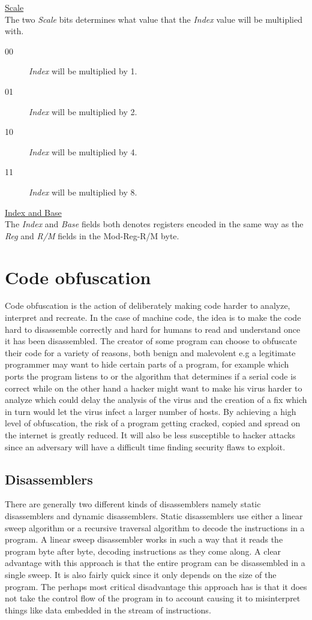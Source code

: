 \documentclass[11pt,twoside]{eitExjobb}
\begin{document}
\noindent \uline{Scale}\\
The two \emph{Scale} bits determines what value that the \emph{Index} value will be multiplied with.\\
\begin{description}
\item[00] \emph{Index} will be multiplied by 1.  
\item[01] \emph{Index} will be multiplied by 2.
\item[10] \emph{Index} will be multiplied by 4.
\item[11] \emph{Index} will be multiplied by 8.
\end{description}

\noindent \uline{Index and Base}\\
The \emph{Index} and \emph{Base} fields both denotes registers encoded in the same way as the \emph{Reg} and \emph{R/M} fields in the Mod-Reg-R/M byte. \cite{bittwiddling}\cite{assemblylanguagex86}

\section{Code obfuscation}
Code obfuscation is the action of deliberately making code harder to analyze, interpret and recreate. In the case of machine code, the idea is to make the code hard to disassemble correctly and hard for humans to read and understand once it has been disassembled. The creator of some program can choose to obfuscate their code for a variety of reasons, both benign and malevolent e.g a legitimate programmer may want to hide certain parts of a program, for example which ports the program listens to or the algorithm that determines if a serial code is correct while on the other hand  a hacker might  want to make his virus harder to analyze which could delay the analysis of the virus and the creation of a fix which in turn would let the virus infect a larger number of hosts. By achieving a high level of obfuscation, the risk of a program getting cracked, copied and spread on the internet is greatly reduced. It will also be less susceptible to hacker attacks since an adversary will have a difficult time finding security flaws to exploit.

\subsection{Disassemblers}
There are generally two different kinds of disassemblers namely static disassemblers and dynamic disassemblers. Static disassemblers use either a linear sweep algorithm or a recursive traversal algorithm to decode the instructions in a program. A linear sweep disassembler works in such a way that it reads the program byte after byte, decoding instructions as they come along. A clear advantage with this approach is that the entire program can be disassembled in a single sweep. It is also fairly quick since it only depends on the size of the program. The perhaps most critical disadvantage this approach has is that it does not take the control flow of the program in to account causing it to misinterpret things like data embedded in the stream of instructions.
\end{document}
